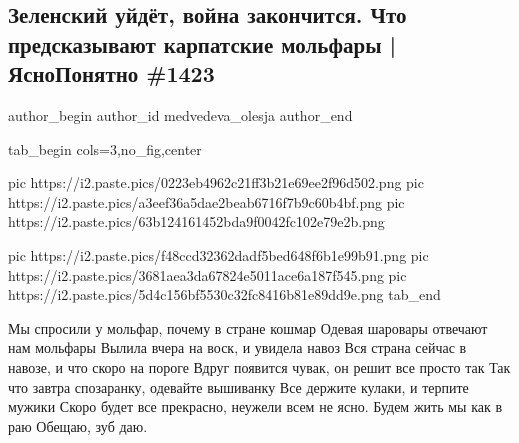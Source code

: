  
 
 
 
 
\subsection{Зеленский уйдёт, война закончится. Что предсказывают карпатские мольфары | ЯсноПонятно \#1423}
\label{sec:06_12_2021.youtube.medvedeva_olesja.1.molfary}


\ifcmt
 author_begin
   author_id medvedeva_olesja
 author_end
\fi

\ifcmt
tab_begin cols=3,no_fig,center

  pic https://i2.paste.pics/0223eb4962c21ff3b21e69ee2f96d502.png
	pic https://i2.paste.pics/a3eef36a5dae2beab6716f7b9c60b4bf.png
	pic https://i2.paste.pics/63b124161452bda9f0042fc102e79e2b.png

	pic https://i2.paste.pics/f48ccd32362dadf5bed648f6b1e99b91.png
	pic https://i2.paste.pics/3681aea3da67824e5011ace6a187f545.png
	pic https://i2.paste.pics/5d4c156bf5530c32fc8416b81e89dd9e.png
tab_end
\fi

\begin{cmtfront}

\obeycr
Мы спросили у мольфар, почему в стране кошмар
Одевая шаровары отвечают нам мольфары 
Вылила вчера на воск, и увидела навоз 
Вся страна сейчас в навозе, и что скоро на пороге
Вдруг появится чувак, он решит все просто так
Так что завтра спозаранку, одевайте вышиванку 
Все держите кулаки, и терпите мужики
Скоро будет все прекрасно, неужели всем не ясно. 
Будем жить мы как в раю 
Обещаю, зуб даю.
\restorecr
	
\end{cmtfront}

